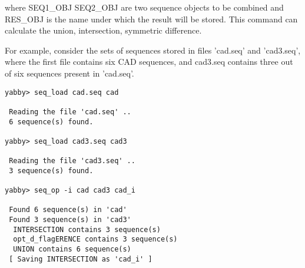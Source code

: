 where SEQ1\_OBJ SEQ2\_OBJ are two sequence objects to be combined 
and RES\_OBJ is the name under which the result will be stored.
This command can calculate the union, intersection, symmetric
difference.

For example, consider the sets of sequences stored in files
'cad.seq' and 'cad3.seq', where the first file contains six 
CAD sequences, and cad3.seq contains three out of six sequences
present in 'cad.seq'.

\begin{verbatim}
yabby> seq_load cad.seq cad

 Reading the file 'cad.seq' ..
 6 sequence(s) found.

yabby> seq_load cad3.seq cad3

 Reading the file 'cad3.seq' ..
 3 sequence(s) found.

yabby> seq_op -i cad cad3 cad_i

 Found 6 sequence(s) in 'cad'
 Found 3 sequence(s) in 'cad3'
  INTERSECTION contains 3 sequence(s)
  opt_d_flagERENCE contains 3 sequence(s)
  UNION contains 6 sequence(s)
 [ Saving INTERSECTION as 'cad_i' ]
\end{verbatim}

